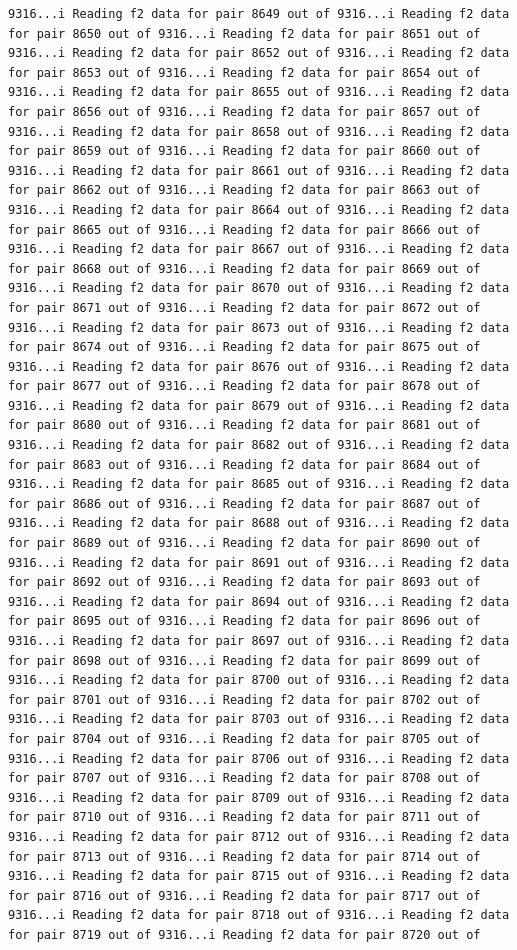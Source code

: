 \documentclass[
]{article}
\begin{document}
\begin{verbatim}
9316...i Reading f2 data for pair 8649 out of 9316...i Reading f2 data for pair 8650 out of 9316...i Reading f2 data for pair 8651 out of 9316...i Reading f2 data for pair 8652 out of 9316...i Reading f2 data for pair 8653 out of 9316...i Reading f2 data for pair 8654 out of 9316...i Reading f2 data for pair 8655 out of 9316...i Reading f2 data for pair 8656 out of 9316...i Reading f2 data for pair 8657 out of 9316...i Reading f2 data for pair 8658 out of 9316...i Reading f2 data for pair 8659 out of 9316...i Reading f2 data for pair 8660 out of 9316...i Reading f2 data for pair 8661 out of 9316...i Reading f2 data for pair 8662 out of 9316...i Reading f2 data for pair 8663 out of 9316...i Reading f2 data for pair 8664 out of 9316...i Reading f2 data for pair 8665 out of 9316...i Reading f2 data for pair 8666 out of 9316...i Reading f2 data for pair 8667 out of 9316...i Reading f2 data for pair 8668 out of 9316...i Reading f2 data for pair 8669 out of 9316...i Reading f2 data for pair 8670 out of 9316...i Reading f2 data for pair 8671 out of 9316...i Reading f2 data for pair 8672 out of 9316...i Reading f2 data for pair 8673 out of 9316...i Reading f2 data for pair 8674 out of 9316...i Reading f2 data for pair 8675 out of 9316...i Reading f2 data for pair 8676 out of 9316...i Reading f2 data for pair 8677 out of 9316...i Reading f2 data for pair 8678 out of 9316...i Reading f2 data for pair 8679 out of 9316...i Reading f2 data for pair 8680 out of 9316...i Reading f2 data for pair 8681 out of 9316...i Reading f2 data for pair 8682 out of 9316...i Reading f2 data for pair 8683 out of 9316...i Reading f2 data for pair 8684 out of 9316...i Reading f2 data for pair 8685 out of 9316...i Reading f2 data for pair 8686 out of 9316...i Reading f2 data for pair 8687 out of 9316...i Reading f2 data for pair 8688 out of 9316...i Reading f2 data for pair 8689 out of 9316...i Reading f2 data for pair 8690 out of 9316...i Reading f2 data for pair 8691 out of 9316...i Reading f2 data for pair 8692 out of 9316...i Reading f2 data for pair 8693 out of 9316...i Reading f2 data for pair 8694 out of 9316...i Reading f2 data for pair 8695 out of 9316...i Reading f2 data for pair 8696 out of 9316...i Reading f2 data for pair 8697 out of 9316...i Reading f2 data for pair 8698 out of 9316...i Reading f2 data for pair 8699 out of 9316...i Reading f2 data for pair 8700 out of 9316...i Reading f2 data for pair 8701 out of 9316...i Reading f2 data for pair 8702 out of 9316...i Reading f2 data for pair 8703 out of 9316...i Reading f2 data for pair 8704 out of 9316...i Reading f2 data for pair 8705 out of 9316...i Reading f2 data for pair 8706 out of 9316...i Reading f2 data for pair 8707 out of 9316...i Reading f2 data for pair 8708 out of 9316...i Reading f2 data for pair 8709 out of 9316...i Reading f2 data for pair 8710 out of 9316...i Reading f2 data for pair 8711 out of 9316...i Reading f2 data for pair 8712 out of 9316...i Reading f2 data for pair 8713 out of 9316...i Reading f2 data for pair 8714 out of 9316...i Reading f2 data for pair 8715 out of 9316...i Reading f2 data for pair 8716 out of 9316...i Reading f2 data for pair 8717 out of 9316...i Reading f2 data for pair 8718 out of 9316...i Reading f2 data for pair 8719 out of 9316...i Reading f2 data for pair 8720 out of 
\end{verbatim}
\end{document}
